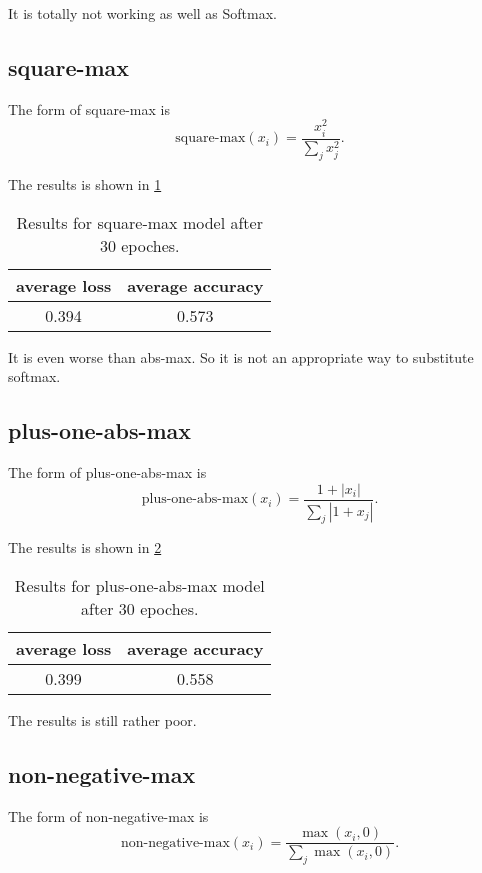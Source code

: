 \documentclass[12pt]{extarticle}
\begin{document}
It is totally not working as well as Softmax.

\subsection{square-max}

The form of square-max is $$\text{square-max}(x_i) = \frac{x_i^2}{\sum_j x_j^2}.$$

The results is shown in \ref{table:3}

	\begin{table}[h]
		\centering
	\begin{tabular}{ |c| c|}
		\hline
		average loss & average accuracy \\ 
		\hline
		0.394 & 0.573 \\  
		\hline
	\end{tabular}

\caption{Results for square-max model after 30 epoches.}
\label{table:3}
\end{table}

It is even worse than abs-max. So it is not an appropriate way to substitute softmax.

\subsection{plus-one-abs-max}

The form of plus-one-abs-max is $$\text{plus-one-abs-max}(x_i) = \frac{1+|x_i|}{\sum_j |1+x_j|}.$$

The results is shown in \ref{table:4}

	\begin{table}[h]
		\centering
	\begin{tabular}{ |c| c|}
		\hline
		average loss & average accuracy \\ 
		\hline
		0.399 & 0.558 \\  
		\hline
	\end{tabular}

\caption{Results for plus-one-abs-max model after 30 epoches.}
\label{table:4}
\end{table}

The results is still rather poor.

\subsection{non-negative-max}

The form of non-negative-max is $$\text{non-negative-max}(x_i) = \frac{\max(x_i,0)}{\sum_j \max(x_i,0)}.$$
\end{document}
